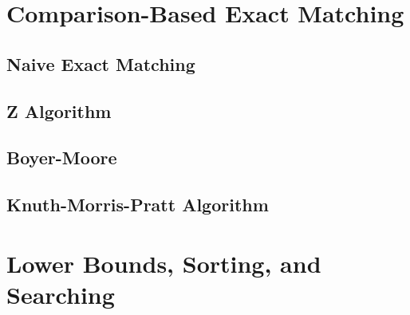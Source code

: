 \documentclass[nobib]{tufte-book}
\newcommand{\N}{\mathbb{N}}
\newcommand{\Z}{\mathbb{Z}}
\newcommand{\R}{\mathbb{R}}
\begin{document}









\mainmatter

\part{Comparison-Based Exact Matching}

\chapter{Naive Exact Matching}


\chapter{Z Algorithm}


\chapter{Boyer-Moore}


\chapter{Knuth-Morris-Pratt Algorithm}

\part{Lower Bounds, Sorting, and Searching}
\end{document}
